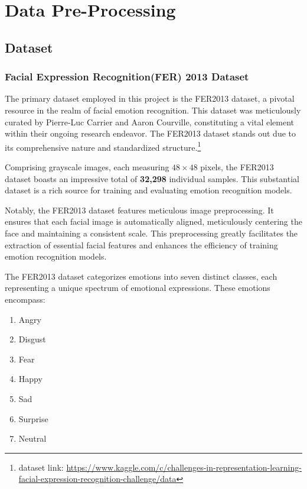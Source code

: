 \chapter{Data Pre-Processing}
\section{Dataset}
\subsection{Facial Expression Recognition(FER) 2013 Dataset}
The primary dataset employed in this project is the FER2013 dataset\cite{FER2013}, a pivotal resource in the realm of facial emotion recognition. This dataset was meticulously curated by Pierre-Luc Carrier and Aaron Courville, constituting a vital element within their ongoing research endeavor. The FER2013 dataset stands out due to its comprehensive nature and standardized structure.\footnote{dataset link: \href{https://www.kaggle.com/c/challenges-in-representation-learning-facial-expression-recognition-challenge/data}{https://www.kaggle.com/c/challenges-in-representation-learning-facial-expression-recognition-challenge/data}}

Comprising grayscale images, each measuring $48 \times 48$ pixels, the FER2013 dataset boasts an impressive total of \textbf{32,298} individual samples. This substantial dataset is a rich source for training and evaluating emotion recognition models.

Notably, the FER2013 dataset features meticulous image preprocessing. It ensures that each facial image is automatically aligned, meticulously centering the face and maintaining a consistent scale. This preprocessing greatly facilitates the extraction of essential facial features and enhances the efficiency of training emotion recognition models.

The FER2013 dataset categorizes emotions into seven distinct classes, each representing a unique spectrum of emotional expressions. These emotions encompass:


\begin{enumerate}
	\item Angry
	\item Disgust
	\item Fear
	\item Happy
	\item Sad
	\item Surprise
	\item Neutral
\end{enumerate}

